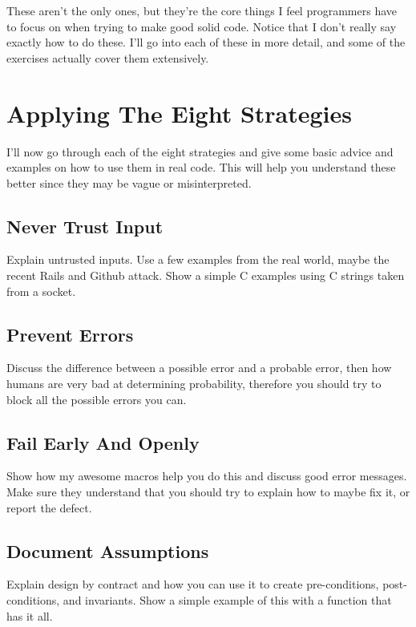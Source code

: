 These aren't the only ones, but they're the core things I feel programmers have
to focus on when trying to make good solid code.  Notice that I don't really
say exactly how to do these.  I'll go into each of these in more detail, and
some of the exercises actually cover them extensively.


\section{Applying The Eight Strategies}

I'll now go through each of the eight strategies and give some basic advice and examples on how to use them in real code.
This will help you understand these better since they may be vague or misinterpreted.


\subsection{Never Trust Input}

Explain untrusted inputs. Use a few examples from the real world, maybe the recent Rails and Github attack.
Show a simple C examples using C strings taken from a socket.

\subsection{Prevent Errors}

Discuss the difference between a possible error and a probable error, then how humans are very bad
at determining probability, therefore you should try to block all the possible errors you can.


\subsection{Fail Early And Openly}

Show how my awesome macros help you do this and discuss good error messages.  Make sure they understand
that you should try to explain how to maybe fix it, or report the defect.

\subsection{Document Assumptions}

Explain design by contract and how you can use it to create pre-conditions, post-conditions, and 
invariants.  Show a simple example of this with a function that has it all.

